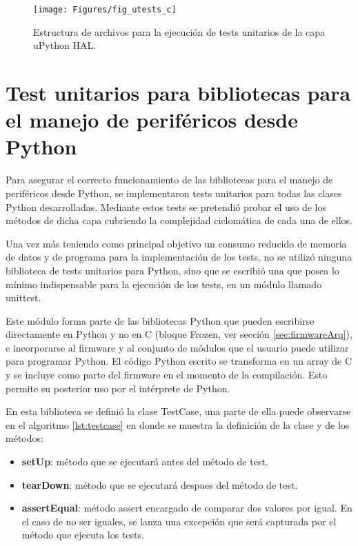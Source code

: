 \begin{figure}[ht]
  \centering
    \texttt{[image: Figures/fig\_utests\_c]}
  \caption{Estructura de archivos para la ejecución de tests unitarios de la capa uPython HAL.}
  \label{fig:utestcarq}
\end{figure}


\section{Test unitarios para bibliotecas para el manejo de periféricos desde Python}
\label{sec:testUnitariosPython}

Para asegurar el correcto funcionamiento de las bibliotecas para el manejo de periféricos desde Python, se implementaron tests unitarios para todas las clases Python desarrolladas. Mediante estos tests se pretendió probar el uso de los métodos de dicha capa cubriendo la complejidad ciclomática de cada una de ellos.

Una vez más teniendo como principal objetivo un consumo reducido de memoria de datos y de programa para la implementación de los tests, no se utilizó ninguna biblioteca de tests unitarios para Python, sino que se escribió una que posea lo mínimo indispensable para la ejecución de los tests, en un módulo llamado unittest. 

Este módulo forma parte de las bibliotecas Python que pueden escribirse directamente en Python y no en C (bloque Frozen, ver sección \ref{sec:firmwareArq}), e incorporarse al firmware y al conjunto de módulos que el usuario puede utilizar para programar Python. El código Python escrito se transforma en un array de C y se incluye como parte del firmware en el momento de la compilación. Esto permite su posterior uso por el intérprete de Python.

En esta biblioteca se definió la clase TestCase, una parte de ella puede observarse en el algoritmo \ref{lst:testcase} en donde se muestra la definición de la clase y de los métodos:

\begin{itemize}
	\item \textbf{setUp}: método que se ejecutará antes del método de test.
	\item \textbf{tearDown}: método que se ejecutará despues del método de test.
	\item \textbf{assertEqual}: método assert encargado de comparar dos valores por igual. En el caso de no ser iguales, se lanza una excepción que será capturada por el método que ejecuta los tests.
\end{itemize}

